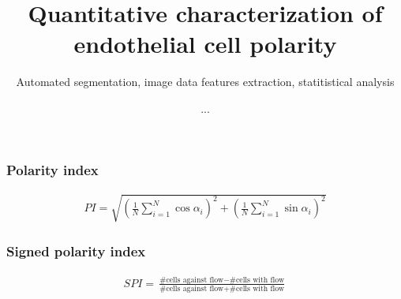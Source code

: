 \documentclass[14pt]{beamer}
\title{\large Quantitative characterization of endothelial cell polarity}
\subtitle{\small Automated segmentation, image data features extraction, statitistical analysis }
\author{\small ...}
\institute{MDC Berlin}
\begin{document}
\begin{frame}[plain]
\maketitle
\centering

\end{frame}


\begin{frame}
\frametitle{\normalsize \bf Polarity index}
\scriptsize
\centering

\begin{align}
    PI = \sqrt{ \left(\frac{1}{N} \sum^N_{i=1} \cos \alpha_i \right)^2 + \left(\frac{1}{N} \sum^N_{i=1} \sin \alpha_i \right)^2}
\end{align}



\end{frame}


\begin{frame}
\frametitle{\normalsize \bf Signed polarity index}
\scriptsize
\centering

\begin{align}
    SPI = \frac{\text{\#cells against flow} - \text{\#cells with flow}}{\text{\#cells against flow} + \text{\#cells with flow}}
\end{align}



\end{frame}




\end{document}
